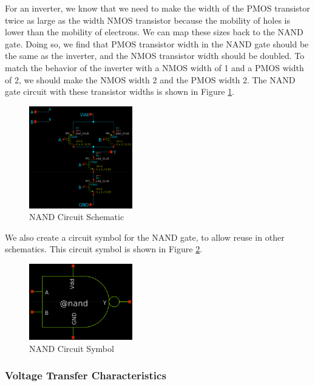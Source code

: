 \documentclass[fleqn]{article}
\begin{document}
	For an inverter, we know that we need to make the width of the PMOS transistor twice as large as the width NMOS transistor because the mobility of holes is lower than the mobility of electrons. We can map these sizes back to the NAND gate. Doing so, we find that PMOS transistor width in the NAND gate should be the same as the inverter, and the NMOS transistor width should be doubled. To match the behavior of the inverter with a NMOS width of 1 and a PMOS width of 2, we should make the NMOS width 2 and the PMOS width 2. The NAND gate circuit with these transistor widths is shown in Figure \ref{fig::nand_schematic}.
	
	\begin{figure}[H]
		\centerline{\includegraphics[width=0.4\textwidth]{nand_schematic.png}}
		\caption{NAND Circuit Schematic}
		\label{fig::nand_schematic}
	\end{figure}

	\noindent We also create a circuit symbol for the NAND gate, to allow reuse in other schematics. This circuit symbol is shown in Figure \ref{fig::nand_symbol}.
	
	\begin{figure}[H]
		\centerline{\includegraphics[width=0.4\textwidth]{nand_symbol.png}}
		\caption{NAND Circuit Symbol}
		\label{fig::nand_symbol}
	\end{figure}
	
	\subsubsection{Voltage Transfer Characteristics}
	
\end{document}
